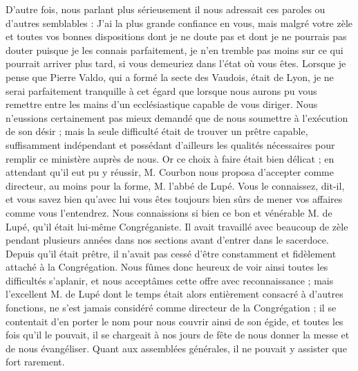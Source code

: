 D'autre fois, nous parlant plus sérieusement il nous adressait ces paroles ou d'autres semblables : J'ai la plus grande confiance en vous, mais malgré votre zèle et toutes vos bonnes dispositions dont je ne doute pas et dont je ne pourrais pas douter puisque je les connais parfaitement, je n'en tremble pas moins sur ce qui pourrait arriver plus tard, si vous demeuriez dans l'état où vous êtes. Lorsque je pense que Pierre Valdo, qui a formé la secte des Vaudois, était de Lyon, je ne serai parfaitement tranquille à cet égard que lorsque nous aurons pu vous remettre entre les mains d'un ecclésiastique capable de vous diriger. Nous n'eussions certainement pas mieux demandé que de nous soumettre à l'exécution de son désir ; mais la seule difficulté était de trouver un prêtre capable, suffisamment indépendant et possédant d'ailleurs les qualités nécessaires pour remplir ce ministère auprès de nous. Or ce choix à faire était bien délicat ; en attendant qu'il eut pu y réussir, M. Courbon nous proposa
d'accepter comme directeur, au moins pour la forme, M. l'abbé de Lupé. Vous le connaissez, dit-il, et vous savez bien qu'avec lui vous êtes toujours bien sûrs de mener vos affaires comme vous l'entendrez. Nous connaissions si bien ce bon et vénérable M. de Lupé, qu'il était lui-même Congréganiste. Il avait travaillé avec beaucoup de zèle pendant plusieurs années dans nos sections avant d'entrer dans le sacerdoce. Depuis qu'il était prêtre, il n'avait pas cessé d'être constamment et fidèlement attaché à la Congrégation. Nous fûmes donc heureux de voir ainsi toutes les difficultés s'aplanir, et nous acceptâmes cette offre avec reconnaissance ; mais l'excellent M. de Lupé dont le temps était alors entièrement consacré à d'autres fonctions, ne s'est jamais considéré comme directeur de la Congrégation ; il se contentait d'en porter le nom pour nous couvrir ainsi de son égide, et toutes les fois qu'il le pouvait, il se chargeait à nos jours de fête de nous donner la messe et de nous évangéliser. Quant aux assemblées générales, il ne pouvait y assister que fort rarement.


